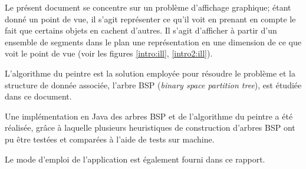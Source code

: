 Le présent document se concentre sur un problème d'affichage graphique;
étant donné un point de vue, il s'agit représenter ce qu'il voit en
prenant en compte le fait que certains objets en cachent d'autres.
Il s'agit d'afficher à partir d'un ensemble de segments dans le
plan une représentation en une dimension de ce que voit le point de vue
(voir les figures
\ref{intro:ill}, \ref{intro2:ill}).

L'algorithme du peintre est la solution employée pour résoudre le problème et
la structure de donnée associée, l'arbre BSP
(\emph{binary space partition tree}), est étudiée dans ce document.

Une implémentation en Java des arbres BSP et de l'algorithme
du peintre a été réalisée, grâce à laquelle plusieurs
heuristiques de construction d'arbres BSP ont pu être testées et
comparées à l'aide de tests sur machine.

Le mode d'emploi de l'application est également fourni dans ce rapport.



